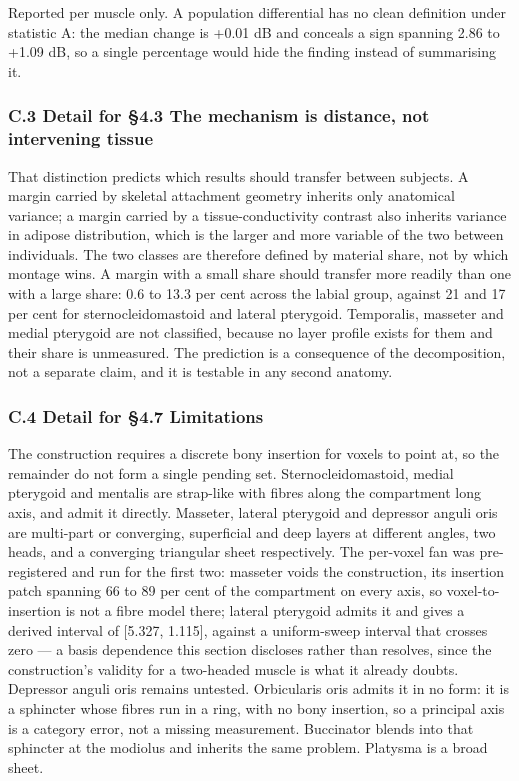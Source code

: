 \documentclass[manuscript,review,anonymous]{acmart}
\begin{document}
Reported per muscle only. A population differential has no clean definition
under statistic A: the median change is +0.01 dB and conceals a sign spanning
\textminus{}2.86 to +1.09 dB, so a single percentage would hide the finding instead of
summarising it.

\subsubsection{C.3 Detail for \S{}4.3 The mechanism is distance, not intervening tissue}\label{c.3-detail-for-4.3-the-mechanism-is-distance-not-intervening-tissue}

That distinction predicts which results should transfer between subjects. A
margin carried by skeletal attachment geometry inherits only anatomical
variance; a margin carried by a tissue-conductivity contrast also inherits
variance in adipose distribution, which is the larger and more variable of the
two between individuals. The two classes are therefore defined by material
share, not by which montage wins. A margin with a small share should transfer
more readily than one with a large share: 0.6 to 13.3 per cent across the labial
group, against 21 and 17 per cent for sternocleidomastoid and lateral pterygoid.
Temporalis, masseter and medial pterygoid are not classified, because no layer
profile exists for them and their share is unmeasured. The prediction is a
consequence of the decomposition, not a separate claim, and it is testable in
any second anatomy.

\subsubsection{C.4 Detail for \S{}4.7 Limitations}\label{c.4-detail-for-4.7-limitations}

The construction requires a discrete bony insertion for voxels to point at, so
the remainder do not form a single pending set. Sternocleidomastoid, medial
pterygoid and mentalis are strap-like with fibres along the compartment long
axis, and admit it directly. Masseter, lateral pterygoid and depressor anguli
oris are multi-part or converging, superficial and deep layers at different
angles, two heads, and a converging triangular sheet respectively. The
per-voxel fan was pre-registered and run for the first two: masseter voids the
construction, its insertion patch spanning 66 to 89 per cent of the
compartment on every axis, so voxel-to-insertion is not a fibre model there;
lateral pterygoid admits it and gives a derived interval of {[}\textminus{}5.327, \textminus{}1.115{]},
against a uniform-sweep interval that crosses zero --- a basis dependence this
section discloses rather than resolves, since the construction's validity for
a two-headed muscle is what it already doubts. Depressor anguli oris remains
untested. Orbicularis oris admits it in no form: it is a sphincter whose
fibres run in a ring, with no bony insertion, so a principal axis is a category
error, not a missing measurement. Buccinator blends into that sphincter at the
modiolus and inherits the same problem. Platysma is a broad sheet.
\end{document}
